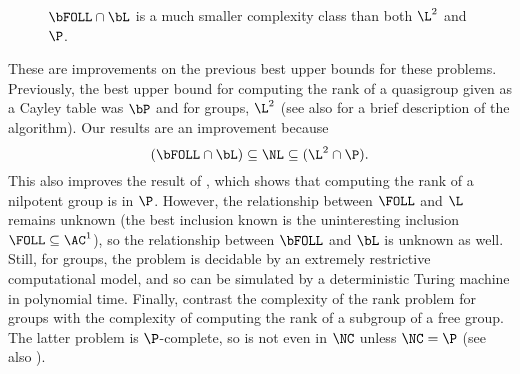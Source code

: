 \documentclass{article}
\begin{document}
\begin{figure}
  \caption{\label{fig:inclusions}$\bFOLL \cap \bL$ is a much smaller complexity class than both $\L^2$ and $\P$.}
  \begin{center}
  \end{center}
\end{figure}

These are improvements on the previous best upper bounds for these problems.
Previously, the best upper bound for computing the rank of a quasigroup given as a Cayley table was $\bP$ \autocite[Section~5]{py96} and for groups, $\L^2$ \autocite{lsz77} (see also \cite[Proposition~6]{at06} for a brief description of the algorithm).
Our results are an improvement because
\begin{equation*}
  (\bFOLL \cap \bL) \subseteq \NL \subseteq (\L^2 \cap \P).
\end{equation*}
This also improves the result of \cite[Theorem~7]{at06}, which shows that computing the rank of a nilpotent group is in $\P$.
However, the relationship between $\FOLL$ and $\L$ remains unknown (the best inclusion known is the uninteresting inclusion $\FOLL \subseteq \AC^1$), so the relationship between $\bFOLL$ and $\bL$ is unknown as well.
Still, for groups, the problem is decidable by an extremely restrictive computational model, and so can be simulated by a deterministic Turing machine in polynomial time.
Finally, contrast the complexity of the rank problem for groups with the complexity of computing the rank of a subgroup of a free group.
The latter problem is $\P$-complete, so is not even in $\NC$ unless $\NC = \P$ \autocite[Theorem~4.9]{am84} (see also \autocite[Problem~A.8.11]{ghr95}).
\end{document}
